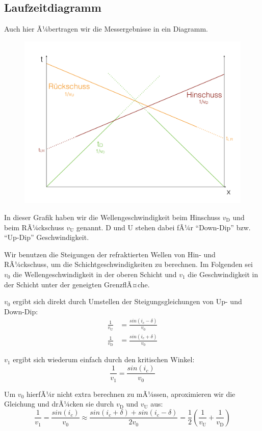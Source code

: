 \subsection{Laufzeitdiagramm}
Auch hier Ã¼bertragen wir die Messergebnisse in ein Diagramm. 

\begin{figure}[H]
	\centering
	\includegraphics[width = \textwidth]{RefraktionsseismikBilder/LaufzeitdiagrammGeneigt}
\end{figure}

In dieser Grafik haben wir die Wellengeschwindigkeit beim Hinschuss $v_{\text{D}}$ und beim RÃ¼ckschuss $v_{\text{U}}$ genannt. D und U stehen dabei fÃ¼r "`Down-Dip"' bzw. "`Up-Dip"' Geschwindigkeit. 

Wir benutzen die Steigungen der refraktierten Wellen von Hin- und RÃ¼ckschuss, um die Schichtgeschwindigkeiten zu berechnen. Im Folgenden sei $v_0$ die Wellengeschwindigkeit in der oberen Schicht und $v_1$ die Geschwindigkeit in der Schicht unter der geneigten GrenzflÃ¤che. 

$v_0$ ergibt sich direkt durch Umstellen der Steigungsgleichungen von Up- und Down-Dip: \begin{align*}
		\frac{1}{v_{\text{U}}} &= \frac{sin(i_c - \delta)}{v_0} \\
		\frac{1}{v_{\text{D}}} &= \frac{sin(i_c + \delta)}{v_0}
\end{align*}

$v_1$ ergibt sich wiederum einfach durch den kritischen Winkel: \begin{equation*}
	\frac{1}{v_1} = \frac{sin(i_c)}{v_0}
\end{equation*}

Um $v_0$ hierfÃ¼r nicht extra berechnen zu mÃ¼ssen, aproximieren wir die Gleichung und drÃ¼cken sie durch $v_{\text{D}}$ und $v_{\text{U}}$ aus: \begin{equation*}
	\frac{1}{v_1} = \frac{sin(i_c)}{v_0} \approx \frac{sin(i_c + \delta) + sin(i_c - \delta)}{2 v_0} = \frac{1}{2} \left( \frac{1}{v_{\text{U}}} + \frac{1}{v_{\text{D}}} \right)
\end{equation*}




